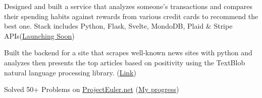 \documentclass[10pt,a4paper,ragged2e]{altacv}
\begin{document}

\begin{fullwidth}
\makecvheader{}
\end{fullwidth}



Designed and built a service that analyzes someone's transactions and compares their spending habits against rewards from various credit cards to recommend the best one. Stack includes Python, Flask, Svelte, MondoDB, Plaid \& Stripe APIs(\href{https://montecarlocredit.com/}{Launching Soon})

\divider{}

Built the backend for a site that scrapes well-known news sites with python and analyzes then presents the top articles based on positivity using the TextBlob natural language processing library. (\href{https://brightfuture.news}{Link})

\divider{}

Solved 50+ Problems on \href{https://projecteuler.net}{ProjectEuler.net} (\href{https://projecteuler.net/profile/EliasLittle.png}{My progress})

%
%
\end{document}
